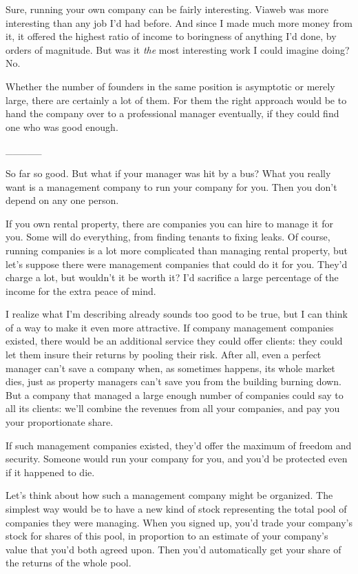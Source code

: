 \documentclass[12pt]{book}
\begin{document}
Sure, running your own company can be fairly interesting. Viaweb was
more interesting than any job I'd had before. And since I made much more
money from it, it offered the highest ratio of income to boringness of
anything I'd done, by orders of magnitude. But was it \emph{the} most
interesting work I could imagine doing? No.~

Whether the number of founders in the same position is asymptotic or
merely large, there are certainly a lot of them. For them the right
approach would be to hand the company over to a professional manager
eventually, if they could find one who was good enough.

\_\_\_\_\_

So far so good. But what if your manager was hit by a bus? What you
really want is a management company to run your company for you. Then
you don't depend on any one person.

If you own rental property, there are companies you can hire to manage
it for you. Some will do everything, from finding tenants to fixing
leaks. Of course, running companies is a lot more complicated than
managing rental property, but let's suppose there were management
companies that could do it for you. They'd charge a lot, but wouldn't it
be worth it? I'd sacrifice a large percentage of the income for the
extra peace of mind.

I realize what I'm describing already sounds too good to be true, but I
can think of a way to make it even more attractive. If company
management companies existed, there would be an additional service they
could offer clients: they could let them insure their returns by pooling
their risk. After all, even a perfect manager can't save a company when,
as sometimes happens, its whole market dies, just as property managers
can't save you from the building burning down. But a company that
managed a large enough number of companies could say to all its clients:
we'll combine the revenues from all your companies, and pay you your
proportionate share.

If such management companies existed, they'd offer the maximum of
freedom and security. Someone would run your company for you, and you'd
be protected even if it happened to die.

Let's think about how such a management company might be organized. The
simplest way would be to have a new kind of stock representing the total
pool of companies they were managing. When you signed up, you'd trade
your company's stock for shares of this pool, in proportion to an
estimate of your company's value that you'd both agreed upon. Then you'd
automatically get your share of the returns of the whole pool.
\end{document}
